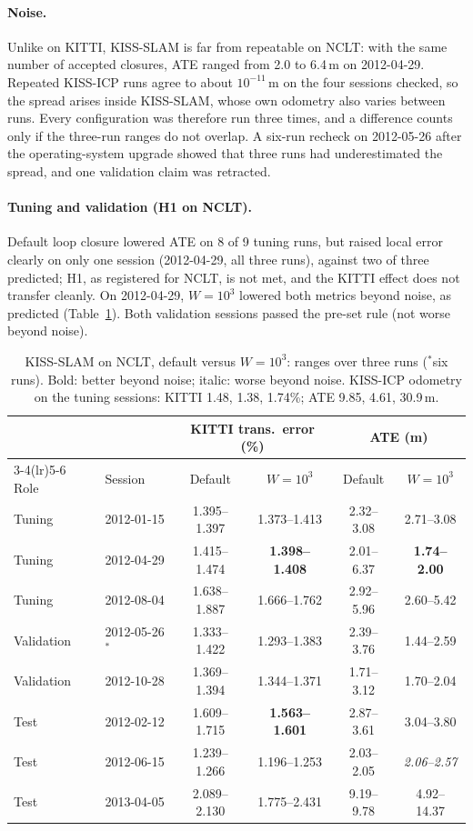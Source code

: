 \documentclass[11pt,a4paper]{article}
\begin{document}
\paragraph{Noise.} Unlike on KITTI, KISS-SLAM is far from repeatable on NCLT: with the same number of accepted
closures, ATE ranged from 2.0 to 6.4\,m on 2012-04-29. Repeated KISS-ICP runs agree to about $10^{-11}$\,m on the
four sessions checked, so the spread arises inside KISS-SLAM, whose own odometry also varies between runs. Every
configuration was therefore run three times, and a difference counts only if the three-run ranges do not overlap.
A six-run recheck on 2012-05-26 after the operating-system upgrade showed that three runs had underestimated the
spread, and one validation claim was retracted.

\paragraph{Tuning and validation (H1 on NCLT).} Default loop closure lowered ATE on 8 of 9 tuning runs, but raised
local error clearly on only one session (2012-04-29, all three runs), against two of three predicted; H1, as
registered for NCLT, is not met, and the KITTI effect does not transfer cleanly. On 2012-04-29, $W=10^3$ lowered
both metrics beyond noise, as predicted (Table~\ref{tab:nclt}). Both validation sessions passed the pre-set rule
(not worse beyond noise).

\begin{table}[h]
\centering
\small
\begin{tabular}{llcccc}
\toprule
 & & \multicolumn{2}{c}{KITTI trans.\ error (\%)} & \multicolumn{2}{c}{ATE (m)} \\
\cmidrule(lr){3-4}\cmidrule(lr){5-6}
Role & Session & Default & $W=10^3$ & Default & $W=10^3$ \\
\midrule
Tuning & 2012-01-15 & 1.395--1.397 & 1.373--1.413 & 2.32--3.08 & 2.71--3.08 \\
Tuning & 2012-04-29 & 1.415--1.474 & \textbf{1.398--1.408} & 2.01--6.37 & \textbf{1.74--2.00} \\
Tuning & 2012-08-04 & 1.638--1.887 & 1.666--1.762 & 2.92--5.96 & 2.60--5.42 \\
Validation & 2012-05-26$^\ast$ & 1.333--1.422 & 1.293--1.383 & 2.39--3.76 & 1.44--2.59 \\
Validation & 2012-10-28 & 1.369--1.394 & 1.344--1.371 & 1.71--3.12 & 1.70--2.04 \\
\midrule
Test & 2012-02-12 & 1.609--1.715 & \textbf{1.563--1.601} & 2.87--3.61 & 3.04--3.80 \\
Test & 2012-06-15 & 1.239--1.266 & 1.196--1.253 & 2.03--2.05 & \textit{2.06--2.57} \\
Test & 2013-04-05 & 2.089--2.130 & 1.775--2.431 & 9.19--9.78 & 4.92--14.37 \\
\bottomrule
\end{tabular}
\caption{KISS-SLAM on NCLT, default versus $W=10^3$: ranges over three runs ($^\ast$six runs). Bold: better beyond
noise; italic: worse beyond noise. KISS-ICP odometry on the tuning sessions: KITTI 1.48, 1.38, 1.74\%; ATE 9.85,
4.61, 30.9\,m.}
\label{tab:nclt}
\end{table}
\end{document}
